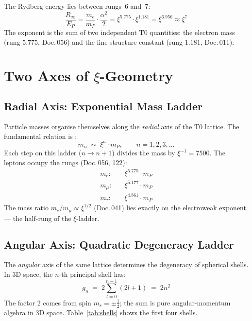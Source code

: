 The Rydberg energy lies between rungs~6 and~7:
\begin{equation}
  \frac{R_\infty}{E_P}
  = \frac{m_e}{m_P} \cdot \frac{\alpha^2}{2}
  = \xi^{5.775} \cdot \xi^{1.181}
  = \xi^{6.956}
  \approx \xi^7
\end{equation}
The exponent is the sum of two independent T0 quantities: the electron mass
(rung $5.775$, Doc.\,056) and the fine-structure constant (rung $1.181$,
Doc.\,011).

\section{Two Axes of \texorpdfstring{$\xi$}{xi}-Geometry}
\label{sec:two-axes}

\subsection{Radial Axis: Exponential Mass Ladder}
\label{subsec:radial}

Particle masses organise themselves along the \emph{radial} axis of the T0
lattice. The fundamental relation is \cite{dok009}:
\begin{equation}
  m_n \;\sim\; \xi^{n} \cdot m_P, \qquad n = 1, 2, 3, \ldots
\end{equation}
Each step on this ladder ($n \to n+1$) divides the mass by $\xi^{-1} = 7500$.
The leptons occupy the rungs (Doc.\,056, 122):
\begin{align}
  m_e:    &\quad \xi^{5.775} \cdot m_P \\
  m_\mu:  &\quad \xi^{5.177} \cdot m_P \\
  m_\tau: &\quad \xi^{4.861} \cdot m_P
\end{align}
The mass ratio $m_e/m_\mu \propto \xi^{1/2}$ (Doc.\,041) lies exactly on the
electroweak exponent — the half-rung of the $\xi$-ladder.

\subsection{Angular Axis: Quadratic Degeneracy Ladder}
\label{subsec:angular}

The \emph{angular} axis of the same lattice determines the degeneracy of
spherical shells. In 3D space, the $n$-th principal shell has:
\begin{equation}
  g_n \;=\; 2 \sum_{l=0}^{n-1} (2l+1) \;=\; 2n^2
  \label{eq:gn}
\end{equation}
The factor 2 comes from spin $m_s = \pm\tfrac{1}{2}$; the sum is pure
angular-momentum algebra in 3D space. Table~\ref{tab:shells} shows the
first four shells.

